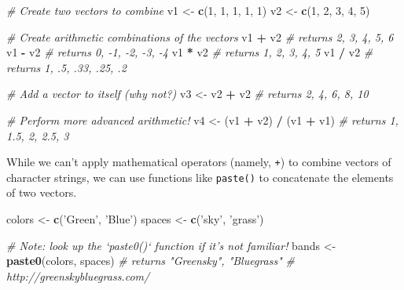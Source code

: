 \documentclass[]{book}
\newenvironment{Shaded}{\begin{snugshade}}{\end{snugshade}}
\newcommand{\KeywordTok}[1]{\textcolor[rgb]{0.13,0.29,0.53}{\textbf{#1}}}
\newcommand{\DecValTok}[1]{\textcolor[rgb]{0.00,0.00,0.81}{#1}}
\newcommand{\StringTok}[1]{\textcolor[rgb]{0.31,0.60,0.02}{#1}}
\newcommand{\CommentTok}[1]{\textcolor[rgb]{0.56,0.35,0.01}{\textit{#1}}}
\newcommand{\OperatorTok}[1]{\textcolor[rgb]{0.81,0.36,0.00}{\textbf{#1}}}
\newcommand{\NormalTok}[1]{#1}
\theoremstyle{definition}
\theoremstyle{definition}
\theoremstyle{remark}
\begin{document}
\begin{Shaded}
\begin{Highlighting}[]
\CommentTok{# Create two vectors to combine}
\NormalTok{v1 <-}\StringTok{ }\KeywordTok{c}\NormalTok{(}\DecValTok{1}\NormalTok{, }\DecValTok{1}\NormalTok{, }\DecValTok{1}\NormalTok{, }\DecValTok{1}\NormalTok{, }\DecValTok{1}\NormalTok{)}
\NormalTok{v2 <-}\StringTok{ }\KeywordTok{c}\NormalTok{(}\DecValTok{1}\NormalTok{, }\DecValTok{2}\NormalTok{, }\DecValTok{3}\NormalTok{, }\DecValTok{4}\NormalTok{, }\DecValTok{5}\NormalTok{)}

\CommentTok{# Create arithmetic combinations of the vectors}
\NormalTok{v1 }\OperatorTok{+}\StringTok{ }\NormalTok{v2  }\CommentTok{# returns 2, 3, 4, 5, 6}
\NormalTok{v1 }\OperatorTok{-}\StringTok{ }\NormalTok{v2  }\CommentTok{# returns 0, -1, -2, -3, -4}
\NormalTok{v1 }\OperatorTok{*}\StringTok{ }\NormalTok{v2  }\CommentTok{# returns 1, 2, 3, 4, 5}
\NormalTok{v1 }\OperatorTok{/}\StringTok{ }\NormalTok{v2  }\CommentTok{# returns 1, .5, .33, .25, .2}

\CommentTok{# Add a vector to itself (why not?)}
\NormalTok{v3 <-}\StringTok{ }\NormalTok{v2 }\OperatorTok{+}\StringTok{ }\NormalTok{v2  }\CommentTok{# returns 2, 4, 6, 8, 10}

\CommentTok{# Perform more advanced arithmetic!}
\NormalTok{v4 <-}\StringTok{ }\NormalTok{(v1 }\OperatorTok{+}\StringTok{ }\NormalTok{v2) }\OperatorTok{/}\StringTok{ }\NormalTok{(v1 }\OperatorTok{+}\StringTok{ }\NormalTok{v1)  }\CommentTok{# returns 1, 1.5, 2, 2.5, 3}
\end{Highlighting}
\end{Shaded}

While we can't apply mathematical operators (namely, \texttt{+}) to
combine vectors of character strings, we can use functions like
\texttt{paste()} to concatenate the elements of two vectors.

\begin{Shaded}
\begin{Highlighting}[]
\NormalTok{colors <-}\StringTok{ }\KeywordTok{c}\NormalTok{(}\StringTok{'Green'}\NormalTok{, }\StringTok{'Blue'}\NormalTok{)}
\NormalTok{spaces <-}\StringTok{ }\KeywordTok{c}\NormalTok{(}\StringTok{'sky'}\NormalTok{, }\StringTok{'grass'}\NormalTok{)}

\CommentTok{# Note: look up the `paste0()` function if it's not familiar!}
\NormalTok{bands <-}\StringTok{ }\KeywordTok{paste0}\NormalTok{(colors, spaces)  }\CommentTok{# returns "Greensky", "Bluegrass"}
\CommentTok{# http://greenskybluegrass.com/}
\end{Highlighting}
\end{Shaded}
\end{document}
